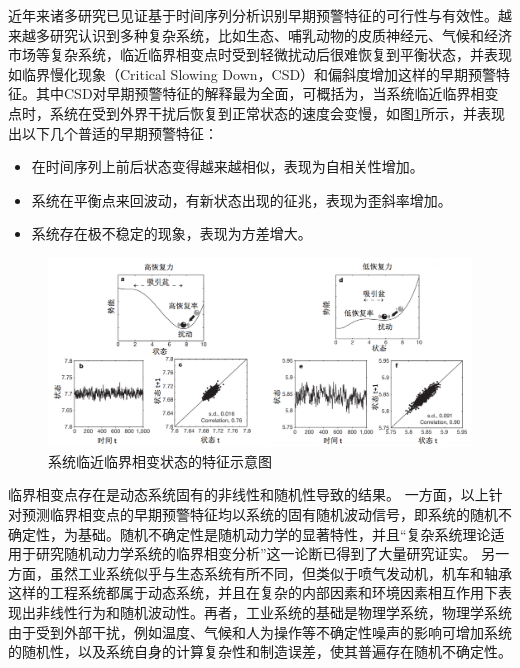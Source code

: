 近年来诸多研究已见证基于时间序列分析识别早期预警特征的可行性与有效性\cite{scheffer2009early,wang2012flickering,boettiger2012quantifying}。越来越多研究认识到多种复杂系统，比如生态\cite{scheffer2001catastrophic,rietkerk2004self,carpenter2011early}、哺乳动物的皮质神经元\cite{meisel2015critical}、气候\cite{lenton2008tipping}和经济市场\cite{may2008complex}等复杂系统，临近临界相变点时受到轻微扰动后很难恢复到平衡状态，并表现如临界慢化现象（Critical Slowing Down，CSD）\cite{scheffer2009early,dakos2008slowing}和偏斜度增加\cite{guttal2008changing}这样的早期预警特征。其中CSD对早期预警特征的解释最为全面，可概括为，当系统临近临界相变点时，系统在受到外界干扰后恢复到正常状态的速度会变慢，如图\ref{fig:csd-early-warning-signal}所示，并表现出以下几个普适的早期预警特征：
\begin{itemize}
  \item 在时间序列上前后状态变得越来越相似，表现为自相关性增加。
  \item 系统在平衡点来回波动，有新状态出现的征兆，表现为歪斜率增加。
  \item 系统存在极不稳定的现象，表现为方差增大。
\end{itemize}
\begin{figure}[H]
\centering
\includegraphics[scale=0.5]{figures/csd-early-warning-signal.png}
\caption{系统临近临界相变状态的特征示意图\cite{scheffer2009early}}
\label{fig:csd-early-warning-signal}
\end{figure}

临界相变点存在是动态系统固有的非线性和随机性导致的结果\cite{bar1997dynamics,endy2005foundations}。
一方面，以上针对预测临界相变点的早期预警特征均以系统的固有随机波动信号，即系统的随机不确定性，为基础。随机不确定性是随机动力学的显著特性\cite{scheffer2001catastrophic}，并且“复杂系统理论适用于研究随机动力学系统的临界相变分析”这一论断已得到了大量研究证实\cite{van2007slow,longtin2010stochastic,carpenter2011early}。
另一方面，虽然工业系统似乎与生态系统有所不同，但类似于喷气发动机，机车和轴承这样的工程系统都属于动态系统，并且在复杂的内部因素和环境因素相互作用下表现出非线性行为和随机波动性\cite{strogatz2018nonlinear,cotilla2012predicting}。再者，工业系统的基础是物理学系统\cite{lee2015cyber}，物理学系统由于受到外部干扰，例如温度、气候和人为操作等不确定性噪声的影响可增加系统的随机性，以及系统自身的计算复杂性和制造误差，使其普遍存在随机不确定性\cite{wolfram1985origins}。

